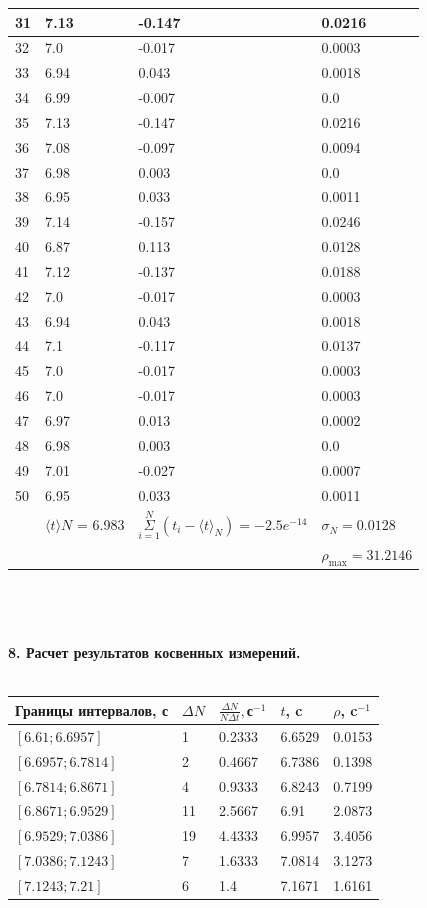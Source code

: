 \documentclass[14pt]{article}
\begin{document}
\begin{tabular}{|p{1cm}|p{5cm}|p{5cm}|p{5cm}|}
\hline
31 & 7.13 & -0.147 & 0.0216 \\
\hline
32 & 7.0 & -0.017 & 0.0003 \\
\hline
33 & 6.94 & 0.043 & 0.0018 \\
\hline
34 & 6.99 & -0.007 & 0.0 \\
\hline
35 & 7.13 & -0.147 & 0.0216 \\
\hline
36 & 7.08 & -0.097 & 0.0094 \\
\hline
37 & 6.98 & 0.003 & 0.0 \\
\hline
38 & 6.95 & 0.033 & 0.0011 \\
\hline
39 & 7.14 & -0.157 & 0.0246 \\
\hline
40 & 6.87 & 0.113 & 0.0128 \\
\hline
41 & 7.12 & -0.137 & 0.0188 \\
\hline
42 & 7.0 & -0.017 & 0.0003 \\
\hline
43 & 6.94 & 0.043 & 0.0018 \\
\hline
44 & 7.1 & -0.117 & 0.0137 \\
\hline
45 & 7.0 & -0.017 & 0.0003 \\
\hline
46 & 7.0 & -0.017 & 0.0003 \\
\hline
47 & 6.97 & 0.013 & 0.0002 \\
\hline
48 & 6.98 & 0.003 & 0.0 \\
\hline
49 & 7.01 & -0.027 & 0.0007 \\
\hline
50 & 6.95 & 0.033 & 0.0011 \\ 
		\hline
		& $\langle t \rangle N$ = 6.983 & $\underset{i=1}{\overset{N}{\Sigma}}(t_i-\langle t \rangle_N)=-2.5e^{-14}$ & $\sigma _N= 0.0128 $ \\
		& & & $\rho_{\max}=31.2146$ \\
		\hline
	\end{tabular} \\ \\ \\	
	\textbf{8. Расчет результатов косвенных измерений.} \\ \\ 
	\begin{tabular}{|p{3cm}|p{3cm}|p{3cm}|p{3cm}|p{3cm}|}
		\hline Границы интервалов, с & $\Delta N$ & $\frac{\Delta N}{N \Delta t},$с$^{-1}$ & $t$, c & $\rho$, c$^{-1}$ \\
		\hline
		$[ 6.61 ; 6.6957 ]$ & 1 & 0.2333 & 6.6529 & 0.0153 \\
		\hline
		$[ 6.6957 ; 6.7814 ]$ & 2 & 0.4667 & 6.7386 & 0.1398 \\
		\hline
		$[ 6.7814 ; 6.8671 ]$ & 4 & 0.9333 & 6.8243 & 0.7199 \\
		\hline
		$[ 6.8671 ; 6.9529 ]$ & 11 & 2.5667 & 6.91 & 2.0873 \\
		\hline
		$[ 6.9529 ; 7.0386 ]$ & 19 & 4.4333 & 6.9957 & 3.4056 \\
		\hline
		$[ 7.0386 ; 7.1243 ]$ & 7 & 1.6333 & 7.0814 & 3.1273 \\
		\hline
		$[ 7.1243 ; 7.21 ]$ & 6 & 1.4 & 7.1671 & 1.6161 \\
		\hline
	\end{tabular} \\ \\
\end{document}
